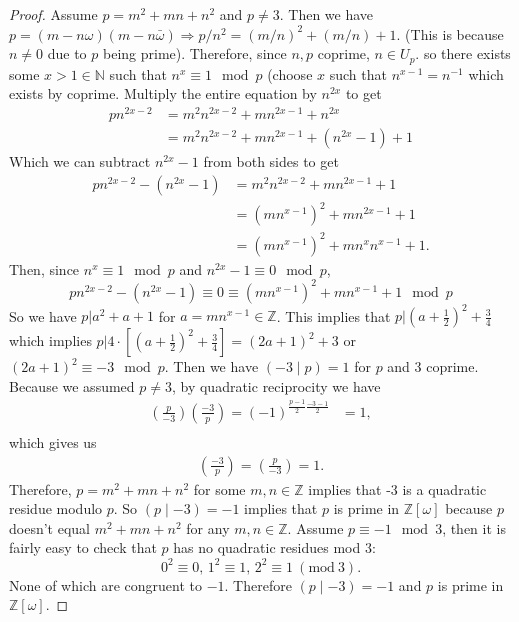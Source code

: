 \documentclass[12pt]{amsart}
\theoremstyle{definition}
\theoremstyle{remark}
\newcommand{\Mod}[1]{\ (\mathrm{mod}\ #1)}
\begin{document}
\begin{proof}
    Assume $p=m^2+mn+n^2$ and $p\not=3$. Then we have $p=(m-n\omega)(m-n\bar{\omega})\Rightarrow p/n^2 = (m/n)^2 + (m/n) + 1$. (This is because $n\not=0$ due to $p$ being prime). Therefore, since $n,p$ coprime, $n\in U_p$. so there exists some $x>1\in\mathbb{N}$ such that $n^{x}\equiv 1 \mod{p}$ (choose $x$ such that $n^{x-1}=n^{-1}$ which exists by coprime. Multiply the entire equation by $n^{2x}$ to get 
    \begin{align*}
        pn^{2x-2} &= m^2n^{2x-2} + mn^{2x-1} + n^{2x}\\
        &= m^2n^{2x-2} + mn^{2x-1} + (n^{2x} - 1) + 1
    \end{align*}
    Which we can subtract $n^{2x}-1$ from both sides to get
    \begin{align*}
        pn^{2x-2} - (n^{2x}-1) &= m^2n^{2x-2} + mn^{2x-1} + 1\\
        &= (mn^{x-1})^2 + mn^{2x-1} + 1\\
        &= (mn^{x-1})^2 + mn^xn^{x-1} + 1.
    \end{align*}
    Then, since $n^x\equiv 1 \mod{p}$ and $n^{2x}-1\equiv 0 \mod{p}$, $$pn^{2x-2} - (n^{2x}-1) \equiv 0 \equiv (mn^{x-1})^2 + mn^{x-1} + 1 \mod{p}$$
    So we have $p | a^2 + a + 1$ for $a=mn^{x-1}\in\mathbb{Z}$. This implies that $p|(a+\frac{1}{2})^2+\frac{3}{4}$ which implies $p|4\cdot\left[(a+\frac{1}{2})^2+\frac{3}{4}\right] = (2a+1)^2 + 3$ or $(2a+1)^2\equiv -3\mod{p}$. Then we have $(-3\mid p)=1$ for $p$ and 3 coprime. Because we assumed $p\not=3$, by quadratic reciprocity we have 
    \begin{align*}
        \left(\frac{p}{-3}\right)\left(\frac{-3}{p}\right) = (-1)^{\frac{p-1}{2}\frac{-3-1}{2}}&=1,\\
    \end{align*}
    which gives us
    \begin{align*}
        \tag{4}\left(\frac{-3}{p}\right) = \left(\frac{p}{-3}\right) = 1.
    \end{align*}
    Therefore, $p=m^2+mn+n^2$ for some $m,n\in\mathbb{Z}$ implies that -3 is a quadratic residue modulo $p$. So $(p\mid -3)=-1$ implies that $p$ is prime in $\mathbb{Z}[\omega]$ because $p$ doesn't equal $m^2+mn+n^2$ for any $m,n\in\mathbb{Z}$. Assume $p\equiv -1 \mod{3}$, then it is fairly easy to check that $p$ has no quadratic residues mod 3: $$0^2\equiv0,\, 1^2\equiv1,\,2^2\equiv1 \Mod 3.$$ None of which are congruent to $-1$. Therefore $(p\mid -3)=-1$ and $p$ is prime in $\mathbb{Z}[\omega]$.
    

\end{proof}
\end{document}
